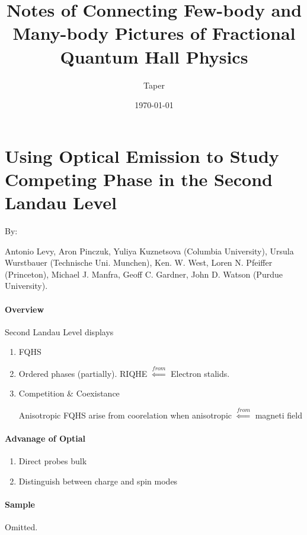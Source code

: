 \documentclass{article}
\title{Notes of Connecting Few-body and Many-body Pictures of Fractional Quantum Hall Physics}
\date{\today}
\author{Taper}
\numberwithin{equation}{subsection} %
\theoremstyle{definition}
\begin{document}
\maketitle
{}
\tableofcontents
\section{Using Optical Emission to Study Competing Phase in the Second
Landau Level}
\label{sec:Using-Optical-Emission-to-Study-Competing-Phase-in-the-Second-Landau-Level}

By: 

Antonio Levy, Aron Pinczuk, Yuliya Kuznetsova (Columbia University),
Ursula Wurstbauer (Technische Uni. Munchen), Ken. W. West, Loren N.
Pfeiffer (Princeton), Michael J. Manfra, Geoff C. Gardner, John D. Watson
(Purdue University).

\paragraph{Overview} Second Landau Level displays
\begin{enumerate}
    \item FQHS
    \item Ordered phases (partially). RIQHE $ \overset{from}{\Leftarrow}$
        Electron stalids.
    \item Competition \& Coexistance

        Anisotropic FQHS arise from coorelation when anisotropic
        $\overset{from}{\Leftarrow}$ magneti field
\end{enumerate}
\paragraph{Advanage of Optial}
\begin{enumerate}
    \item Direct probes bulk
    \item Distinguish between charge and spin modes
\end{enumerate}
\paragraph{Sample} Omitted.
\end{document}

